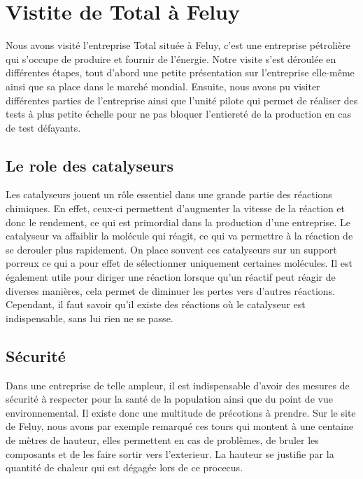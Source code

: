 \documentclass[10pt,a4paper]{article}
\begin{document}
\section{Vistite de Total à Feluy}

Nous avons visité l'entreprise Total située à Feluy, c'est une entreprise pétrolière qui s'occupe de produire et fournir de l'énergie. Notre visite s'est déroulée en différentes étapes, tout d'abord une petite présentation sur l'entreprise elle-même ainsi que sa place dans le marché mondial. Ensuite, nous avons pu visiter différentes parties de l'entreprise ainsi que l'unité pilote qui permet de réaliser des tests à plus petite échelle pour ne pas bloquer l'entiereté de la production en cas de test défayants.

\subsection{Le role des catalyseurs}

Les catalyseurs jouent un rôle essentiel dans une grande partie des réactions chimiques. En effet, ceux-ci permettent d'augmenter la vitesse de la réaction et donc le rendement, ce qui est primordial dans la production d'une entreprise. Le catalyseur va affaiblir la molécule qui réagit, ce qui va permettre à la réaction de se derouler plus rapidement.
On place souvent ces catalyseurs sur un support porreux ce qui a pour effet de sélectionner uniquement certaines molécules. Il est également utile pour diriger une réaction lorsque qu'un réactif peut réagir de diverses manières, cela permet de diminuer les pertes vers d'autres réactions. Cependant, il faut savoir qu'il existe des réactions où le catalyseur est indispensable, sans lui  rien ne se passe.

\subsection{Sécurité}

Dans une entreprise de telle ampleur, il est indispensable d'avoir des mesures de sécurité à respecter pour la santé de la population ainsi que du point de vue environnemental. Il existe donc une multitude de précotions à prendre. Sur le site de Feluy, nous avons par exemple remarqué ces tours qui montent à une centaine de mètres de hauteur, elles permettent en cas de problèmes, de bruler les composants et de les faire sortir vers l'exterieur. La hauteur se justifie par la quantité de chaleur qui est dégagée lors de ce procecus.
\end{document}
